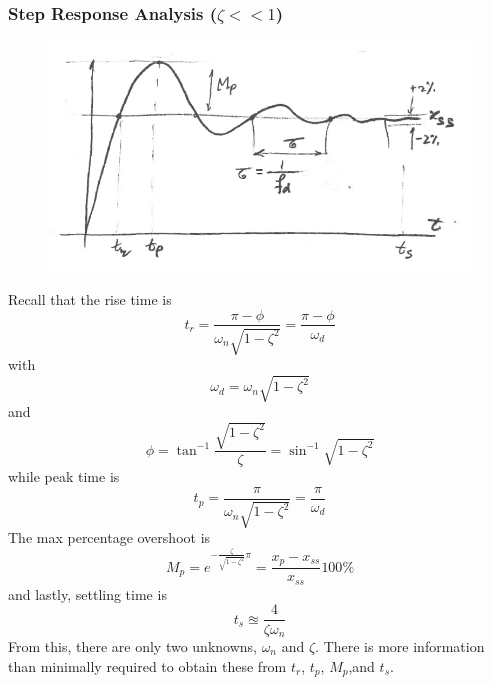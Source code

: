\documentclass[12pt,letter]{article}
\begin{document}
\subsubsection{Step Response Analysis ($\zeta << 1$)}
			\begin{figure}[H]
				\centering
				\includegraphics[width=5in]{../figures/system_identification_step_response.png}
			\end{figure}

Recall that the rise time is
\begin{equation}
t_r = \frac{\pi - \phi}{\omega_n \sqrt{1-\zeta^2}} = \frac{\pi - \phi}{\omega_d}
\end{equation}
with
\begin{equation}
\omega_d = \omega_n \sqrt{1-\zeta^2}
\end{equation}
and
\begin{equation}
\phi = \tan^{-1} \frac{\sqrt{1-\zeta^2}}{\zeta} = \sin^{-1} \sqrt{1-\zeta^2}
\end{equation}
while peak time is
\begin{equation}
t_p = \frac{\pi}{\omega_n \sqrt{1-\zeta^2}} = \frac{\pi}{\omega_d}
\end{equation}
The max percentage overshoot is
\begin{equation}
M_p  = e^{- \frac{\zeta}{\sqrt{1-\zeta^2}} \pi }= \frac{x_p - x_{ss}}{x_{ss}} 100\%
\end{equation}
and lastly, settling time is
\begin{equation}
t_s \approxeq \frac{4}{\zeta \omega_n}
\end{equation}
From this, there are only two unknowns, $\omega_n$ and $\zeta$. There is more information than minimally required to obtain these from $t_r$, $t_p$, $M_p$,and $t_s$.
\end{document}
